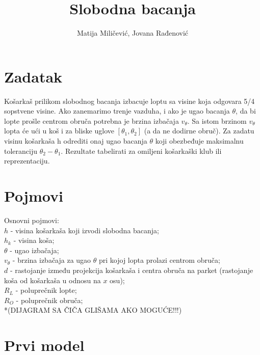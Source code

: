\documentclass[a4paper, 12pt]{article}
\begin{document}
\title{Slobodna bacanja}

\author{Matija Miličević, Jovana Rađenović}

\maketitle

\section{Zadatak}

Košarkaš prilikom slobodnog bacanja izbacuje loptu sa visine koja odgovara 5/4 sopstvene visine. Ako zanemarimo trenje vazduha, i ako je ugao bacanja $\theta$, da bi lopte prošle centrom obruča potrebna je brzina izbačaja $v_\theta$. Sa istom brzinom $v_\theta$ lopta će ući u koš i za bliske uglove $[\theta_1, \theta_2]$ (a da ne dodirne obruč). Za zadatu visinu košarkaša h odrediti onaj ugao bacanja $\theta$ koji obezbeđuje maksimalnu toleranciju $\theta_2 - \theta_1$. Rezultate tabelirati za omiljeni košarkaški klub ili reprezentaciju.

\section{Pojmovi}

Osnovni pojmovi:\\
$h$ - visina košarkaša koji izvodi slobodna bacanja;\\
$h_k$ - visina koša;\\
$\theta$ - ugao izbačaja;\\
$v_\theta$ - brzina izbačaja za ugao $\theta$ pri kojoj lopta prolazi centrom obruča;\\
$d$ - rastojanje između projekcija košarkaša i centra obruča na parket (rastojanje koša od košarkaša u odnosu na $x$ osu);\\
$R_L$ - poluprečnik lopte;\\
$R_O$ - poluprečnik obruča;\\

*(DIJAGRAM SA ČIČA GLIŠAMA AKO MOGUĆE!!!)\\


\section{Prvi model}
\end{document}
